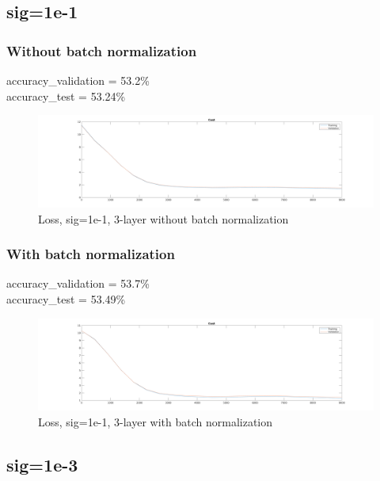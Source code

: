 \subsection{sig=1e-1}
\subsubsection{Without batch normalization}
accuracy\_validation = 53.2\%\\
accuracy\_test = 53.24\%
\begin{figure}[ht]
    \includegraphics[width=\textwidth]{../code/result_pics/cost_lambda=0.00500_ns=2250_cycles=2_k=3_sig=0.10000_bn=0.png}
    \caption{Loss, sig=1e-1, 3-layer without batch normalization}
\end{figure}

\subsubsection{With batch normalization}
accuracy\_validation = 53.7\%\\
accuracy\_test = 53.49\%
\begin{figure}[ht]
    \includegraphics[width=\textwidth]{../code/result_pics/cost_lambda=0.00500_ns=2250_cycles=2_k=3_sig=0.10000_bn=1.png}
    \caption{Loss, sig=1e-1, 3-layer with batch normalization}
\end{figure}

\clearpage

\subsection{sig=1e-3}
